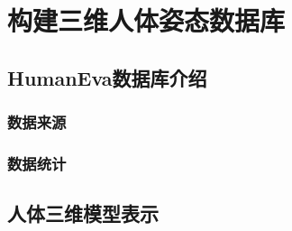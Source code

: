 


\chapter{构建三维人体姿态数据库}
\section{HumanEva数据库介绍}
\subsection{数据来源}

\subsection{数据统计}

\section{人体三维模型表示}
\label{sec:skeleton}



